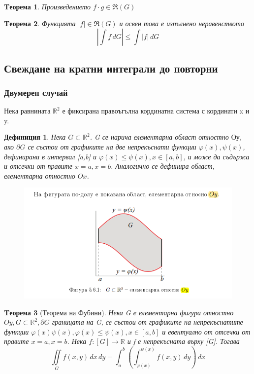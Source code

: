 \documentclass[a4paper,fleqn,12pt]{article}
\newtheorem{theorem}{Tеорема}[subsection]
\newtheorem{definition}{Дефиниция}[subsection]
\theoremstyle{definition}
\begin{document}
\begin{theorem}
Произведението $f \cdot g \in \Re(G)$
\end{theorem}

\begin{theorem}
Функцията $\vert f \vert \in \Re(G)$ и освен това е изпълнено неравенството 
$$\left \vert \int f \, dG \right \vert \leq \int \vert f \vert \, dG$$
\end{theorem}

\newpage
\subsection{Свеждане на кратни интеграли до повторни}

\subsubsection{Двумерен случай}
Нека равнината $\mathbb{R}^2$ е фиксирана правоъгълна кординатна система с кординати x и y.

\begin{definition}
Нека $G \subset \mathbb{R}^2$. G се нарича елементарна област отностно $Оу$, ако $\partial G$ се състои от графиките на две непрекъснати функции $\varphi(x), \psi(x)$, дефинирани в интервал [a,b] и $\varphi(x) \leq \psi(x), x\in [a,b]$, и може да съдържа и отсечки от правите $x = a, x = b$. Аналогично се дефинира област, елементарна отностно $Ox$.
\begin{figure}[htp!]
  \includegraphics{Pics/calc/lec9-1.png}
\end{figure}
\end{definition}

\begin{theorem}[Теорема на Фубини]
Нека G е елементарна фигура отностно $Oy, G \subset \mathbb{R}^2, \partial G$ границата на G, се състои от графиките на непрекъснатите функции $\varphi(x) \psi(x), \varphi(x) \leq \psi(x), x\in [a,b]$ и евентуално от отсечки от правите $x = a, x = b$. Нека $f: [G] \to \mathbb{R}$ и f е непрекъсната върху [G]. Тогава
$$\iint\limits_{G} f(x,y) \, dx \, dy = \int_a ^b \left( \int_{\varphi(x)} ^{\psi(x)}  f(x,y) \, dy \right) \, dx$$
\end{theorem}
\end{document}
